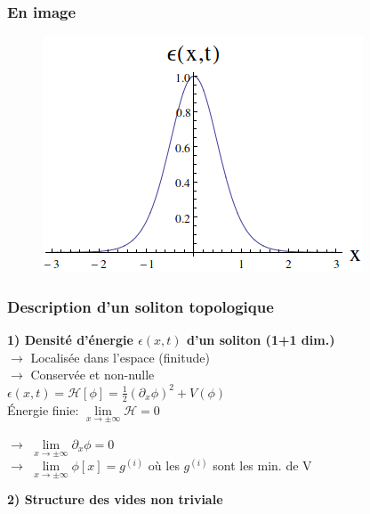 \documentclass[handout]{beamer}
\begin{document}
	\begin{frame}\frametitle{En image}

	\begin{figure}[0.3\textwidth]
   \includegraphics[scale=0.5]{densite.png}
    \end{figure}
    \end{frame}

\begin{frame}\frametitle{Description d'un soliton topologique}

	\textbf{1) Densité d'énergie $\epsilon(x,t)$ d'un soliton (1+1 dim.)} 
	\\$\rightarrow$ Localisée dans l'espace (finitude)
	\\$\rightarrow$ Conservée et non-nulle \\[0.5 cm]

	$\epsilon(x,t) =\mathcal{H}[\phi] = \frac{1}{2} (\partial_x \phi)^2 + V(\phi)$\\[0.25 cm]
Énergie finie: $\lim\limits_{x \to \pm\infty}\mathcal{H} =0$
	\begin{exampleblock}{}
	$\rightarrow$ $\lim\limits_{x \to \pm\infty}\partial_x \phi =0$
	\\$\rightarrow$  $\lim\limits_{x \to \pm\infty} \phi[x] = g^{(i)}$ où les $g^{(i)}$ sont les min. de V	\\
	\end{exampleblock}
	\textbf{2) Structure des vides non triviale} 
		\end{frame}

	
\end{document}
